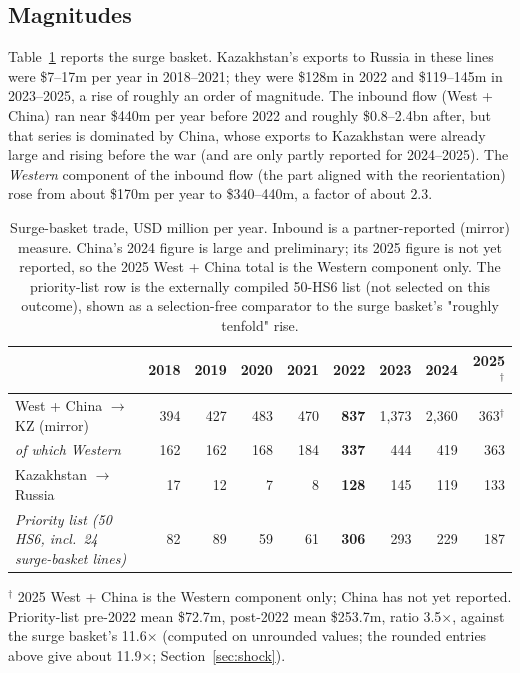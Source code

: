 \documentclass[12pt]{article}
\begin{document}
\subsection{Magnitudes}

Table~\ref{tab:magnitudes} reports the surge basket. Kazakhstan's exports to Russia in these
lines were \$7--17m per year in 2018--2021; they were \$128m in 2022 and \$119--145m in
2023--2025, a rise of roughly an order of magnitude. The inbound flow (West + China) ran near \$440m per year before 2022 and roughly
\$0.8--2.4bn after, but that series is dominated by China, whose exports to Kazakhstan were
already large and rising before the war (and are only partly reported for 2024--2025). The
\emph{Western} component of the inbound flow (the part aligned with the reorientation) rose
from about \$170m per year to \$340--440m, a factor of about $2.3$.

\begin{table}[t]
\centering
\caption{Surge-basket trade, USD million per year. Inbound is a partner-reported (mirror)
measure. China's 2024 figure is large and preliminary; its 2025 figure is not yet reported,
so the 2025 West + China total is the Western component only. The priority-list row is the
externally compiled 50-HS6 list (not selected on this outcome), shown as a selection-free
comparator to the surge basket's "roughly tenfold" rise.}
\label{tab:magnitudes}
\small
\setlength{\tabcolsep}{4pt}
\begin{tabular}{lrrrrrrrr}
\toprule
 & 2018 & 2019 & 2020 & 2021 & \textbf{2022} & 2023 & 2024 & 2025$^{\dagger}$ \\
\midrule
West + China $\to$ KZ (mirror) & 394 & 427 & 483 & 470 & \textbf{837} & 1{,}373 & 2{,}360 & 363$^{\dagger}$ \\
\quad \emph{of which Western}   & 162 & 162 & 168 & 184 & \textbf{337} & 444 & 419 & 363 \\
Kazakhstan $\to$ Russia        &  17 &  12 &   7 &   8 & \textbf{128} & 145 & 119 & 133 \\
\emph{Priority list (50 HS6, incl.\ 24 surge-basket lines)} & 82 & 89 & 59 & 61 & \textbf{306} & 293 & 229 & 187 \\
\bottomrule
\end{tabular}

\vspace{2pt}
\footnotesize $^{\dagger}$ 2025 West + China is the Western component only; China has not yet
reported. Priority-list pre-2022 mean \$72.7m, post-2022 mean \$253.7m, ratio 3.5$\times$,
against the surge basket's 11.6$\times$ (computed on unrounded values; the rounded entries above give about 11.9$\times$; Section~\ref{sec:shock}).
\end{table}
\end{document}
